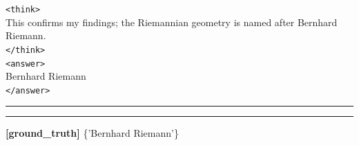 \begin{table}[H]
\begin{reasonbox}[title=\framework{} Response Example - \dataset{QALD10en}]
\begin{blueblock}
\texttt{<think>} \\
This confirms my findings; the Riemannian geometry is named after Bernhard Riemann. \\
\texttt{</think>} \\
\texttt{<answer>} \\
Bernhard Riemann \\
\texttt{</answer>}
\end{blueblock}

\vspace{0.5em}\hrule\vspace{0.5em}
\vspace{0.1em}\hrule\vspace{0.5em}

\textbf{[ground\_truth]} \{'Bernhard Riemann'\}

\end{reasonbox}
\end{table}



